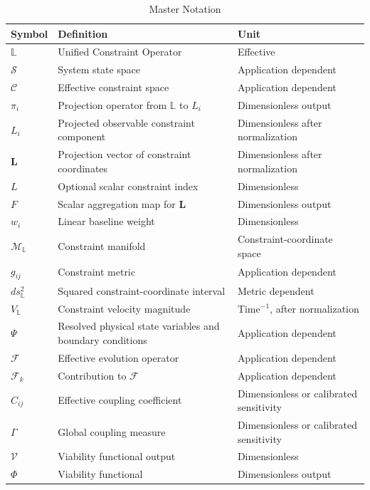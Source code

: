 \begin{table}
\centering
\caption{Master Notation}
\label{tab:master_notation}
\begin{tabular}{p{}p{}p{}}
\hline
Symbol & Definition & Unit \\
\hline
\(\mathbb{L}\) & Unified Constraint Operator & Effective \\
\(\mathcal{S}\) & System state space & Application dependent \\
\(\mathcal{C}\) & Effective constraint space & Application dependent \\
\(\pi_i\) & Projection operator from \(\mathbb{L}\) to \(L_i\) & Dimensionless output \\
\(L_i\) & Projected observable constraint component & Dimensionless after normalization \\
\(\mathbf{L}\) & Projection vector of constraint coordinates & Dimensionless after normalization \\
\(L\) & Optional scalar constraint index & Dimensionless \\
\(F\) & Scalar aggregation map for \(\mathbf{L}\) & Dimensionless output \\
\(w_i\) & Linear baseline weight & Dimensionless \\
\(\mathcal{M}_{\mathbb{L}}\) & Constraint manifold & Constraint-coordinate space \\
\(g_{ij}\) & Constraint metric & Application dependent \\
\(ds_{\mathbb{L}}^2\) & Squared constraint-coordinate interval & Metric dependent \\
\(V_{\mathbb{L}}\) & Constraint velocity magnitude & Time\(^{-1}\), after normalization \\
\(\Psi\) & Resolved physical state variables and boundary conditions & Application dependent \\
\(\mathcal{F}\) & Effective evolution operator & Application dependent \\
\(\mathcal{F}_k\) & Contribution to \(\mathcal{F}\) & Application dependent \\
\(C_{ij}\) & Effective coupling coefficient & Dimensionless or calibrated sensitivity \\
\(\Gamma\) & Global coupling measure & Dimensionless or calibrated sensitivity \\
\(\mathcal{V}\) & Viability functional output & Dimensionless \\
\(\Phi\) & Viability functional & Dimensionless output \\

\end{tabular}
\end{table}
